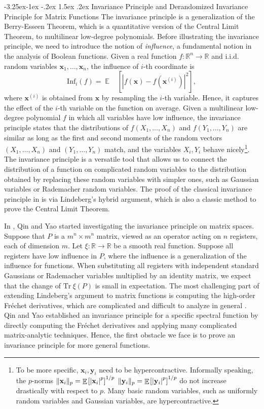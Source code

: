 \documentclass[11pt]{article}
\makeatletter
\renewcommand{\subsubsection}{\@startsection{subsubsection}{2}{\z@}%
             {-3.25ex\@plus -1ex \@minus -.2ex}%
             {1.5ex \@plus .2ex}%
             {\normalfont\normalsize\scshape\bfseries}}
\theoremstyle{plain}
\theoremstyle{definition}
\newcommand {\minusspace} {\: \! \!}
\newcommand {\Fn} [2] {\ensuremath{ #1 \minusspace \Br{ #2 } }}
\newcommand{\reals}{{\mathbb R}}
\newcommand {\br} [1] {\ensuremath{ \left( #1 \right) }}
\newcommand {\Br} [1] {\ensuremath{ \left[ #1 \right] }}
\DeclarePairedDelimiter{\norm}{\lVert}{\rVert}
\newcommand {\ab} [1] {\ensuremath{ \left| #1 \right| }}
\DeclareMathOperator*{\bigE}{\mathbb{E}}
\newcommand {\expec} [2] {\Fn{\bigE_{\substack{#1}}}{#2}}
\newcommand {\Tr} {\ensuremath{ \mathrm{Tr} }}
\newcommand{\randx}{\ensuremath{\mathbf{x}}}
\newcommand{\randy}{\ensuremath{\mathbf{y}}}
\newcommand{\infi}[1]{\ensuremath{\mathrm{Inf}_i}\br{#1}}
\newcommand{\1}{\mathbb{1}} %
\makeatother
\begin{document}
\subsubsection{Invariance Principle and Derandomized Invariance Principle for Matrix Functions} The invariance principle \cite{mossel2005noise} is a generalization of the Berry-Esseen Theorem, which is a quantitative version of the Central Limit Theorem, to multilinear low-degree polynomials. 
Before illustrating the invariance principle, we need to introduce the notion of {\em influence}, a fundamental notion in the analysis of Boolean functions. Given a real function $f:\reals^n\rightarrow\reals$ and i.i.d. random variables $\randx_1,\ldots, \randx_n$, the influence of $i$-th coordinate is 
\[\infi{f}=\expec{}{\ab{f\br{\randx}-f\br{\randx^{(i)}}}^2},\]
where $\randx^{(i)}$ is obtained from $\randx$ by resampling the $i$-th variable.  Hence, it captures the effect of the $i$-th variable on the function on average. Given a multilinear low-degree polynomial $f$ in which all variables have low influence, the invariance principle states that the distributions of $f\br{X_1,\ldots, X_n}$ and $f(Y_1,\ldots, Y_n)$ are similar as long as the first and second moments of the random vectors $\br{X_1,\ldots, X_n}$ and $(Y_1,\ldots, Y_n)$ match, and the variables $X_i, Y_i$ behave nicely\footnote{To be more specific, $\randx_i, \randy_i$ need to be hypercontractive. Informally speaking, the $p$-norms  $\norm{\randx_i}_p=\expec{}{\ab{\randx_i}^p}^{1/p}$ $\norm{\randy_i}_p=\expec{}{\ab{\randy_i}^p}^{1/p}$ do not increase drastically with respect to $p$. Many basic random variables, such as uniformly random variables and Gaussian variables, are hypercontractive.}. The invariance principle is a versatile tool that allows us to connect the distribution of a function on complicated random variables to the distribution obtained by replacing these random variables with simpler ones, such as Gaussian variables or Rademacher random variables. The proof of the classical invariance principle in \cite{mossel2005noise} is via Lindeberg's hybrid argument, which is also a classic method to prove the Central Limit Theorem.

In \cite{qin2021nonlocal}, Qin and Yao started investigating the invariance principle on matrix spaces. Suppose that $P$ is a $m^n\times m^n$ matrix, viewed as an operator acting on $n$ registers, each of dimension $m$. 
Let $\xi:\reals\rightarrow\reals$ be a smooth real function. Suppose all registers have low influence in $P$, where the influence is a generalization of the influence for functions. When substituting all registers with independent standard Gaussians or Rademacher variables multiplied by an identity matrix, we expect that the change of $\Tr~\xi(P)$ is small in expectation. The most challenging part of extending Lindeberg's argument to matrix functions is computing the high-order Fr\'echet derivatives, which are complicated and difficult to analyze in general \cite{SENDOV2007240}. Qin and Yao \cite{qin2021nonlocal} established an invariance principle for a specific spectral function by directly computing the Fr\'echet derivatives and applying many complicated matrix-analytic techniques.
Hence, the first obstacle we face is to prove an invariance principle for more general functions.
\end{document}
